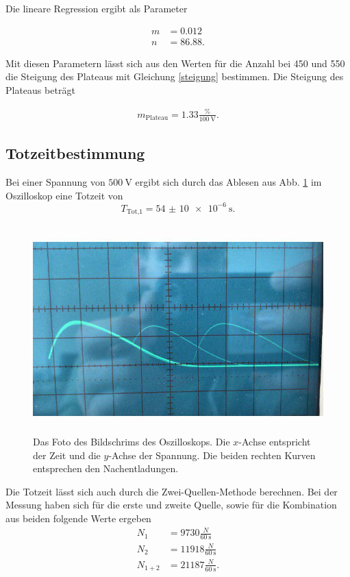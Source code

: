 \noindent Die lineare Regression ergibt als Parameter

\begin{align*} 
   m &= 0.012 \\
   n &= 86.88.
\end{align*}

\noindent Mit diesen Parametern lässt sich aus den Werten für die Anzahl bei \num{450} und \num{550} die Steigung des Plateaus mit Gleichung \eqref{steigung} bestimmen.
Die Steigung des Plateaus beträgt 

\begin{align*} 
    m_\text{Plateau} = 1.33 \frac{\si{\percent}}{\SI{100}{\volt}}.
\end{align*}

\subsection{Totzeitbestimmung}

Bei einer Spannung von $\SI{500}{\volt}$ ergibt sich durch das Ablesen aus Abb. \ref{foto} im Oszilloskop eine Totzeit von 
\begin{equation*}
    T_\text{Tot,1} = \SI{54(10)e-6}{\second}.
\end{equation*}

\begin{figure}
    \centering
    \includegraphics[width=12cm, height=8cm]{build/foto.jpg}
    \caption{Das Foto des Bildschrims des Oszilloskops. Die $x$-Achse entspricht der Zeit und die $y$-Achse der Spannung. Die beiden rechten Kurven entsprechen den Nachentladungen.}
    \label{foto}
\end{figure}

\noindent Die Totzeit lässt sich auch durch die Zwei-Quellen-Methode berechnen. 
Bei der Messung haben sich für die erste und zweite Quelle, sowie für die Kombination aus beiden folgende Werte ergeben
\begin{align*} 
   N_1 &= 9730 \frac{N}{\SI{60}{\second}}\\
   N_2 &= 11918 \frac{N}{\SI{60}{\second}} \\
   N_{1+2} &= 21187 \frac{N}{\SI{60}{\second}}.
\end{align*}


